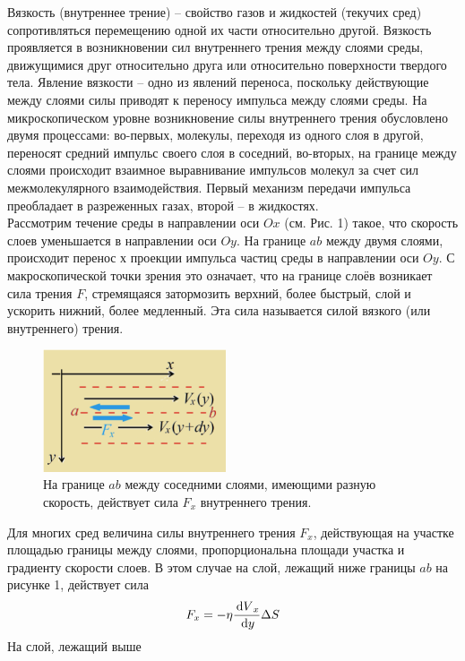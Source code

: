 \documentclass[a4paper]{article}
\begin{document}
Вязкость (внутреннее трение) – свойство газов и жидкостей
(текучих сред) сопротивляться перемещению одной их части относительно другой. Вязкость проявляется в возникновении сил
внутреннего трения между слоями среды, движущимися друг относительно друга или относительно поверхности твердого тела.
Явление вязкости – одно из явлений переноса, поскольку действующие между слоями силы приводят к переносу импульса
между слоями среды.
На микроскопическом уровне возникновение силы внутреннего трения обусловлено двумя процессами: во-первых, молекулы,
переходя из одного слоя в другой, переносят средний импульс
своего слоя в соседний, во-вторых, на границе между слоями
происходит взаимное выравнивание импульсов молекул за счет
сил межмолекулярного взаимодействия. Первый механизм передачи импульса преобладает в разреженных газах, второй – в
жидкостях.\\
Рассмотрим течение среды в направлении оси $Ox$ (см. Рис.
1) такое, что скорость слоев уменьшается в направлении оси $Oy$. На границе $ab$ между двумя слоями, происходит перенос $х$ проекции импульса частиц среды в направлении оси $Oy$. С макроскопической точки зрения это означает, что на границе слоёв
возникает сила трения $F$, стремящаяся затормозить верхний, более быстрый, слой и ускорить нижний, более медленный. Эта
сила называется силой вязкого (или внутреннего) трения.\\
\begin{figure}
  \centering
  \includegraphics[width=0.48\textwidth]{pick_1}
  \caption{На границе $ab$ между соседними слоями, имеющими разную скорость, действует сила $F_x$ внутреннего трения.}
\end{figure}
Для многих сред величина силы внутреннего трения $F_x$,
действующая на участке площадью границы между слоями, пропорциональна площади
участка и градиенту скорости
слоев. В этом случае на слой,
лежащий ниже границы $ab$ на
рисунке 1, действует сила
\begin{equation}
    F_x = -\eta \dfrac{\dl V_x}{\dl y}\Delta S
\end{equation}
На слой, лежащий выше
\end{document}
